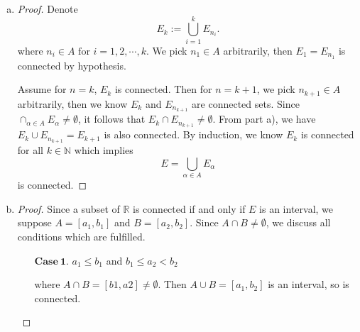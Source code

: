 \begin{Exercise}
\begin{enumerate}[a)]
\begin{proof}
\begin{enumerate}
If $B_2 \neq \emptyset$, then since $B_2 = B\cap V$, we claim $B_1$ and $B_2$ separate $B$ by definition.
Otherwise $B_2 = \emptyset$, then continue to consider
\begin{alignat*}{7}
\quad&& A\cup B &= U\cup V \\
\implies&& A\cap(A\cup B) &= A\cap(U\cup V) \\
\implies&& A &= (A\cap U)\cup (A\cap V) \\
\implies&& A &= A\cap V \\
\implies&& A &\subseteq V.
\end{alignat*}
Since $B\cap V = \emptyset$ implies $V \subseteq B^c$, so $A \subseteq B^c$. We conclude $A\cap B = \emptyset$ which leads to a contradiction with hypothesis that $A\cap B\neq \emptyset$.

A similar argument proves the condition $B\cap V = \emptyset$. 
\end{enumerate}
Finally, we conclude $A\cap B$ is connected under the hypothesis as promised.
\end{proof}

\item
\begin{proof}
Denote $$E_k := \bigcup_{i=1}^{k}E_{n_i}.$$
where $n_i\in A \mbox{ for } i=1,2,\cdots,k$.
We pick $n_1\in A$ arbitrarily, then $E_1 = E_{n_1}$ is connected by hypothesis.

Assume for $n=k$, $E_k$ is connected. Then for $n=k+1$, we
pick $n_{k+1}\in A$ arbitrarily, then we know $E_k$ and $E_{n_{k+1}}$ are connected sets. Since $\cap_{\alpha\in A}E_{\alpha} \neq \emptyset$, it follows that $E_k \cap E_{n_{k+1}} \neq \emptyset$. From part a), we have $E_k \cup E_{n_{k+1}} = E_{k+1}$ is also connected.
By induction, we know $E_k$ is connected for all $k\in\mathbb{N}$ which implies
$$
E = \bigcup_{\alpha\in A} E_{\alpha}
$$ is connected.
\end{proof}

\item
\begin{proof}
Since a subset of $\mathbb{R}$ is connected if and only if $E$ is an interval, we suppose $A = [a_1, b_1]$ and $B = [a_2, b_2]$. Since $A\cap B \neq \emptyset$, we discuss all conditions which are fulfilled.
\begin{enumerate}
\item [$\mathbf{Case\ 1.}$]
$a_1 \leq b_1$ and $b_1 \leq a_2 < b_2$

where $A\cap B = [b1, a2] \neq \emptyset$. Then $A\cup B = [a_1, b_2]$ is an interval, so is connected.


\end{enumerate}
\end{proof}
\end{enumerate}
\end{Exercise}
